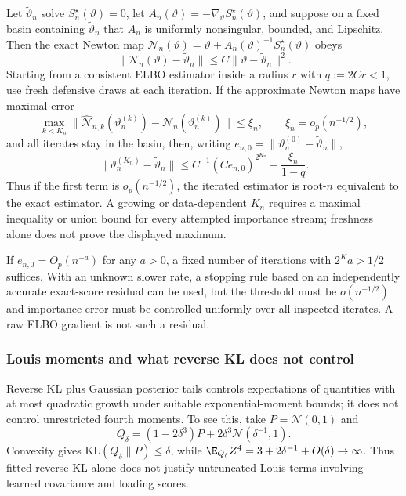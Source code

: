 \begin{theorem}
\label{thm:iterated_defensive_correction}
Let $\widetilde\vartheta_n$ solve $S_n^\star(\vartheta)=0$, let
$A_n(\vartheta)=-\nabla_\vartheta S_n^\star(\vartheta)$, and suppose on a
fixed basin containing $\widetilde\vartheta_n$ that $A_n$ is uniformly
nonsingular, bounded, and Lipschitz.  Then the exact Newton map
$\mathcal N_n(\vartheta)=\vartheta+A_n(\vartheta)^{-1}S_n^\star(\vartheta)$
obeys
\[
 \|\mathcal N_n(\vartheta)-\widetilde\vartheta_n\|
 \leq C\|\vartheta-\widetilde\vartheta_n\|^2.
\]
Starting from a consistent ELBO estimator inside a radius $r$ with
$q:=2Cr<1$, use fresh defensive draws at each iteration.  If the approximate
Newton maps have maximal error
\[
 \max_{k<K_n}\|\widehat{\mathcal N}_{n,k}(\vartheta_n^{(k)})
 -\mathcal N_n(\vartheta_n^{(k)})\|\leq\xi_n,
 \qquad \xi_n=o_p(n^{-1/2}),
\]
and all iterates stay in the basin, then, writing
$e_{n,0}=\|\vartheta_n^{(0)}-\widetilde\vartheta_n\|$,
\begin{equation}
 \|\vartheta_n^{(K_n)}-\widetilde\vartheta_n\|
 \leq C^{-1}(Ce_{n,0})^{2^{K_n}}+\frac{\xi_n}{1-q}.
 \label{eq:iterated_newton_bound}
\end{equation}
Thus if the first term is $o_p(n^{-1/2})$, the iterated estimator is
root-$n$ equivalent to the exact estimator.  A growing or data-dependent
$K_n$ requires a maximal inequality or union bound for every attempted
importance stream; freshness alone does not prove the displayed maximum.
\end{theorem}

If $e_{n,0}=O_p(n^{-a})$ for any $a>0$, a fixed number of iterations with
$2^{K}a>1/2$ suffices.  With an unknown slower rate, a stopping rule based on
an independently accurate exact-score residual can be used, but the threshold
must be $o(n^{-1/2})$ and importance error must be controlled uniformly over
all inspected iterates.  A raw ELBO gradient is not such a residual.

\subsubsection{Louis moments and what reverse KL does not control}
\label{subsubsec:louis_moments}

Reverse KL plus Gaussian posterior tails controls expectations of quantities
with at most quadratic growth under suitable exponential-moment bounds; it
does not control unrestricted fourth moments.  To see this, take
$P=\mathcal N(0,1)$ and
\[
 Q_\delta=(1-2\delta^3)P+2\delta^3\mathcal N(\delta^{-1},1).
\]
Convexity gives
$\mathrm{KL}(Q_\delta\|P)\leq\delta$, while
$\E_{Q_\delta}Z^4=3+2\delta^{-1}+O(\delta)\to\infty$.  Thus fitted reverse KL
alone does not justify untruncated Louis terms involving learned covariance
and loading scores.

